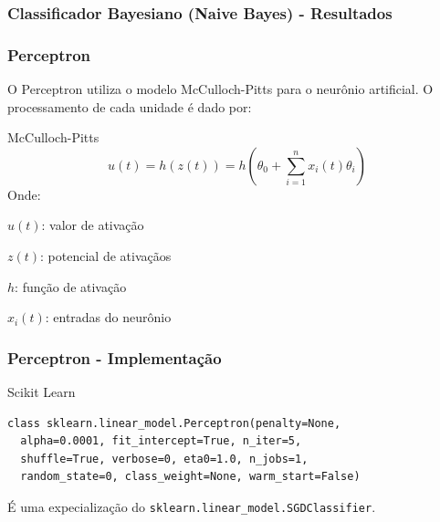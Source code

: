 \documentclass{beamer}
\begin{document}
\begin{frame}
\frametitle{Classificador Bayesiano (Naive Bayes) - Resultados}

\end{frame}

\begin{frame}
\frametitle{Perceptron}
O Perceptron utiliza o modelo McCulloch-Pitts para o neurônio artificial. O processamento de cada unidade é dado por:
\begin{block}{McCulloch-Pitts}
\[ u(t) = h(z(t)) = h \left( \theta_0 + \sum_{i=1}^n x_i(t) \theta_i \right) \]
Onde:

$u(t)$: valor de ativação

$z(t)$: potencial de ativaçãos

$h$: função de ativação

$x_i(t)$: entradas do neurônio
\end{block}
\end{frame}


\begin{frame}[fragile] %
\frametitle{Perceptron - Implementação}
\begin{block}{Scikit Learn}
\begin{verbatim}
class sklearn.linear_model.Perceptron(penalty=None, 
  alpha=0.0001, fit_intercept=True, n_iter=5, 
  shuffle=True, verbose=0, eta0=1.0, n_jobs=1, 
  random_state=0, class_weight=None, warm_start=False)
\end{verbatim}
\end{block}
É uma expecialização do \verb|sklearn.linear_model.SGDClassifier|.
\end{frame}
\end{document}
